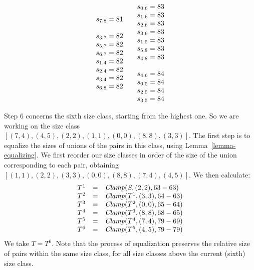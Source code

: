 \documentclass[letterpaper]{article}
\theoremstyle{definition}
\newcommand{\Clamp}{\protect{\mbox{\textit{Clamp}}}}
\begin{document}
\[\begin{array}[t]{lllll}
\begin{array}{l}
s_{7, 8} = 81 \\
\\
s_{3, 7} = 82 \\
s_{5, 7} = 82 \\
s_{6, 7} = 82 \\
s_{1, 4} = 82 \\
s_{2, 4} = 82 \\
s_{3, 4} = 82 \\
s_{6, 8} = 82 \\
   \end{array}
 &
  \begin{array}{l}
s_{0, 6} = 83 \\
s_{1, 6} = 83 \\
s_{2, 6} = 83 \\
s_{3, 6} = 83 \\
s_{1, 5} = 83 \\
s_{5, 8} = 83 \\
s_{4, 8} = 83 \\
\\
s_{4, 6} = 84 \\
s_{0, 5} = 84 \\
s_{2, 5} = 84 \\
s_{3, 5} = 84 \\
\end{array}
\end{array}
\]

Step $6$ concerns the sixth size class, starting from the highest one.
So  we are working on the size class $[(7,4),(4,5),(2, 2),(1,1),(0,0),(8,8), (3,3)]$.  The first step is to equalize the sizes of unions of the pairs in this class, using Lemma~\ref{lemma-equalizing}.  We first reorder our size classes in order of the size of the union corresponding to each pair, obtaining $[(1,1), (2, 2), (3,3),  (0,0),(8,8), (7,4),(4,5)]$.  We then calculate:
\[ \begin{array}{lcl}
 T^1  & = &  \Clamp(S,(2,2), 63-63)\\

T^2 & = & \Clamp(T^1,(3,3),  64-63)\\

T^{3} & = & \Clamp(T^{2}, (0,0), 65-64 )\\
T^{4} & = & \Clamp(T^{3}, (8,8), 68-65 )\\
T^{5} & = & \Clamp(T^4, (7,4),79-69 )\\
T^{6} & = & \Clamp(T^{5}, (4,5), 79-79)\\
\end{array}
\]
We take $T = T^6$.  Note that the process of equalization preserves the relative size of pairs within the same size class, for all size classes above the current (sixth) size class.
\end{document}
